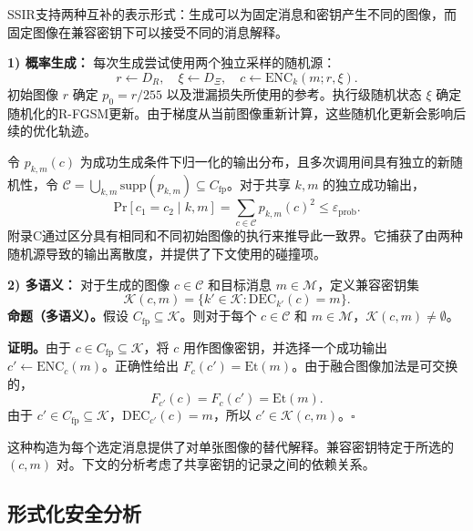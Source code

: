 SSIR支持两种互补的表示形式：生成可以为固定消息和密钥产生不同的图像，而固定图像在兼容密钥下可以接受不同的消息解释。

\textbf{1) 概率生成：}
每次生成尝试使用两个独立采样的随机源：
\begin{equation}
r \leftarrow D_R, \quad \xi \leftarrow D_\Xi, \quad c \leftarrow \mathrm{ENC}_k(m; r, \xi). \tag{13}
\end{equation}
初始图像 \(r\) 确定 \(p_0 = r/255\) 以及泄漏损失所使用的参考。执行级随机状态 \(\xi\) 确定随机化的R-FGSM更新。由于梯度从当前图像重新计算，这些随机化更新会影响后续的优化轨迹。

令 \(p_{k,m}(c)\) 为成功生成条件下归一化的输出分布，且多次调用间具有独立的新随机性，令 \(\mathcal{C} = \bigcup_{k,m} \mathrm{supp}(p_{k,m}) \subseteq C_{\mathrm{fp}}\)。对于共享 \(k, m\) 的独立成功输出，
\begin{equation}
\mathrm{Pr}[c_1 = c_2 \mid k, m] = \sum_{c \in \mathcal{C}} p_{k,m}(c)^2 \le \varepsilon_{\mathrm{prob}}. \tag{14}
\end{equation}
附录C通过区分具有相同和不同初始图像的执行来推导此一致界。它捕获了由两种随机源导致的输出离散度，并提供了下文使用的碰撞项。

\textbf{2) 多语义：}
对于生成的图像 \(c \in \mathcal{C}\) 和目标消息 \(m \in \mathcal{M}\)，定义兼容密钥集
\begin{equation}
\mathcal{K}(c, m) = \{ k' \in \mathcal{K} : \mathrm{DEC}_{k'}(c) = m \}. \tag{15}
\end{equation}
\textbf{命题（多语义）。}假设 \(C_{\mathrm{fp}} \subseteq \mathcal{K}\)。则对于每个 \(c \in \mathcal{C}\) 和 \(m \in \mathcal{M}\)，\(\mathcal{K}(c, m) \neq \emptyset\)。

\textbf{证明。}由于 \(c \in C_{\mathrm{fp}} \subseteq \mathcal{K}\)，将 \(c\) 用作图像密钥，并选择一个成功输出 \(c' \leftarrow \mathrm{ENC}_c(m)\)。正确性给出 \(F_c(c') = \mathrm{Et}(m)\)。由于融合图像加法是可交换的，
\begin{equation}
F_{c'}(c) = F_c(c') = \mathrm{Et}(m). \tag{16}
\end{equation}
由于 \(c' \in C_{\mathrm{fp}} \subseteq \mathcal{K}\)，\(\mathrm{DEC}_{c'}(c) = m\)，所以 \(c' \in \mathcal{K}(c, m)\)。\(\square\)

这种构造为每个选定消息提供了对单张图像的替代解释。兼容密钥特定于所选的 \((c, m)\) 对。下文的分析考虑了共享密钥的记录之间的依赖关系。
\subsection*{形式化安全分析}

